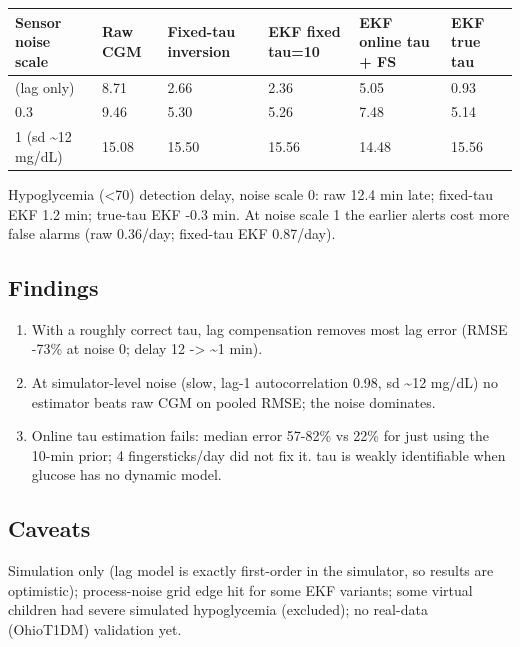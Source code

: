 \documentclass[11pt,a4paper]{article}
\providecommand{\tightlist}{\setlength{\itemsep}{0pt}\setlength{\parskip}{0pt}}
\begin{document}
\begin{longtable}[]{@{}llllll@{}}
\toprule\noalign{}
Sensor noise scale & Raw CGM & Fixed-tau inversion & EKF fixed tau=10 &
EKF online tau + FS & EKF true tau \\
\midrule\noalign{}
\endhead
\bottomrule\noalign{}
\endlastfoot
0 (lag only) & 8.71 & 2.66 & 2.36 & 5.05 & 0.93 \\
0.3 & 9.46 & 5.30 & 5.26 & 7.48 & 5.14 \\
1 (sd \textasciitilde12 mg/dL) & 15.08 & 15.50 & 15.56 & 14.48 &
15.56 \\
\end{longtable}

Hypoglycemia (\textless70) detection delay, noise scale 0: raw 12.4 min
late; fixed-tau EKF 1.2 min; true-tau EKF -0.3 min. At noise scale 1 the
earlier alerts cost more false alarms (raw 0.36/day; fixed-tau EKF
0.87/day).

\hypertarget{findings}{%
\subsection{Findings}\label{findings}}

\begin{enumerate}
\def\labelenumi{\arabic{enumi}.}
\tightlist
\item
  With a roughly correct tau, lag compensation removes most lag error
  (RMSE -73\% at noise 0; delay 12 -\textgreater{} \textasciitilde1
  min).
\item
  At simulator-level noise (slow, lag-1 autocorrelation 0.98, sd
  \textasciitilde12 mg/dL) no estimator beats raw CGM on pooled RMSE;
  the noise dominates.
\item
  Online tau estimation fails: median error 57-82\% vs 22\% for just
  using the 10-min prior; 4 fingersticks/day did not fix it. tau is
  weakly identifiable when glucose has no dynamic model.
\end{enumerate}

\hypertarget{caveats}{%
\subsection{Caveats}\label{caveats}}

Simulation only (lag model is exactly first-order in the simulator, so
results are optimistic); process-noise grid edge hit for some EKF
variants; some virtual children had severe simulated hypoglycemia
(excluded); no real-data (OhioT1DM) validation yet.
\end{document}
